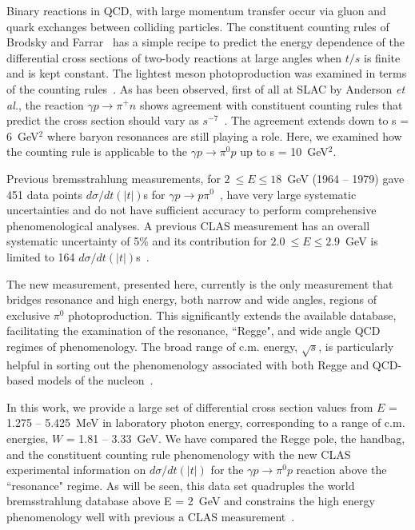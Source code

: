 \documentclass[aps,prc,twocolumn,floatfix,showpacs,preprintnumbers,amsmath,amssymb,superscriptaddress,linenumbers]{revtex4-1}
\begin{document}

Binary reactions in QCD, with large momentum transfer 
occur via gluon and quark exchanges between colliding particles. The 
constituent counting rules of Brodsky and Farrar~\cite{Brodsky:1973kr} 
has a simple recipe to predict the energy dependence of the 
differential cross sections of two-body reactions at large angles 
when $t/s$ is finite and is kept constant.  The lightest meson 
photoproduction was examined in terms of the counting 
rules~\cite{Anderson:1976ph,Jenkins:1995bk,Zhu:2002su,Chen:2009sda,
Kong:2015yzn}. As has been observed, first of all at SLAC by 
Anderson \textit{et al.}, the reaction $\gamma p\rightarrow\pi^+n$ 
shows agreement with constituent counting rules that predict the 
cross section should vary as $s^{-7}$~\cite{Anderson:1976ph}. The 
agreement extends down to s = 6~GeV$^2$ where baryon resonances are 
still playing a role.  Here, we examined how the counting rule is 
applicable to the $\gamma p\rightarrow\pi^0p$ up to s = 10~GeV$^2$. 

Previous bremsstrahlung measurements, for $2~\leq E\leq 
18$~GeV (1964 -- 1979) gave 451 data points $d\sigma/dt(|t|)$s for 
$\gamma p\rightarrow p\pi^0$~\cite{brem}, have very large systematic 
uncertainties and do not have sufficient accuracy to perform 
comprehensive phenomenological analyses.  A previous CLAS measurement 
has an overall systematic uncertainty of 5\% and its contribution for 
$2.0~\leq E\leq 2.9$~GeV is limited to 164 
$d\sigma/dt(|t|)$s~\cite{Dugger:2007bt}. 

The new measurement, presented here, currently is the only 
		measurement that bridges resonance and high energy, both narrow and wide 
		angles, regions of exclusive $\pi^0$ photoproduction. This significantly 
		extends the available database, facilitating the examination of the 
		resonance, ``Regge", and wide angle QCD regimes of phenomenology. The 
		broad range of c.m. energy, $\sqrt{s}$, is particularly helpful in 
		sorting out the phenomenology associated with both Regge and QCD-based 
		models of the nucleon~\cite{Kroll:2017hym}.

In this work, we provide a large set of differential 
cross section values from $E$ = 1.275 -- 5.425~MeV in laboratory photon 
energy, corresponding to a range of c.m. energies, $W$ = 1.81 -- 
3.33~GeV.  We have compared the Regge pole, the handbag, and the 
constituent counting rule phenomenology with the new CLAS experimental 
information on $d\sigma/dt(|t|)$ for the $\gamma p\rightarrow\pi^0p$ 
reaction above the ``resonance" regime. As will be seen, this data 
set quadruples the world bremsstrahlung database above E = 2~GeV and 
constrains the high energy phenomenology well with previous a CLAS 
measurement~\cite{Dugger:2007bt}.
\end{document}

